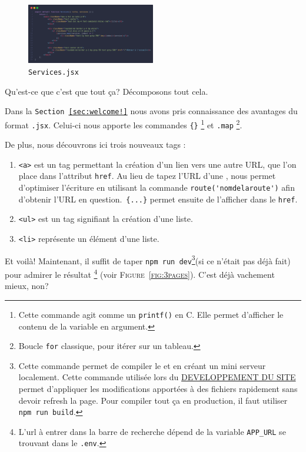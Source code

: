 \newpage

\begin{figure}
    \centering
    \includegraphics[width=0.5\textwidth]{figures-C1/services.jsx.png}
    \caption{\texttt{Services.jsx}}
\end{figure}

Qu'est-ce que c'est que tout ça? Décomposons tout cela.

 Dans la \texttt{Section~\ref{sec:welcome!}} nous avons pris connaissance des avantages du format \verb|.jsx|. Celui-ci nous apporte les commandes \verb|{}| \footnote{Cette commande agit comme un \verb|printf()| en C. Elle permet d'afficher le contenu de la variable en argument.} et \verb|.map| \footnote{Boucle \verb|for| classique, pour itérer sur un tableau.}.

\begin{minipage}{\textwidth}
De plus, nous découvrons ici trois nouveaux tags \html{}:

\begin{enumerate}
    \item \verb|<a>| est un tag permettant la création d'un lien vers une autre URL, que l'on place dans l'attribut \verb|href|. Au lieu de tapez l'URL d'une \route{}, \inertia{} nous permet d'optimiser l'écriture en utilisant la commande \verb|route('nomdelaroute')| afin d'obtenir l'URL en question.~\verb|{...}| permet ensuite de l'afficher dans le \verb|href|.
    \item \verb|<ul>| est un tag signifiant la création d'une liste.
    \item \verb|<li>| représente un élément d'une liste.
\end{enumerate}
\end{minipage}


Et voilà! Maintenant, il suffit de taper \verb|npm run dev|\footnote{Cette commande permet de compiler le \css{} et \js{} en créant un mini serveur localement. Cette commande utilisée lors du \underline{DEVELOPPEMENT DU SITE} permet d'appliquer les modifications apportées à des fichiers rapidement sans devoir refresh la page. Pour compiler tout ça en production, il faut utiliser \verb|npm run build|.}(si ce n'était pas déjà fait) pour admirer le résultat \footnote{L'url à entrer dans la barre de recherche dépend de la variable \texttt{APP\_URL} se trouvant dans le \texttt{.env}.} (voir \textsc{Figure~\ref{fig:3pages}}). C'est déjà vachement mieux, non?

